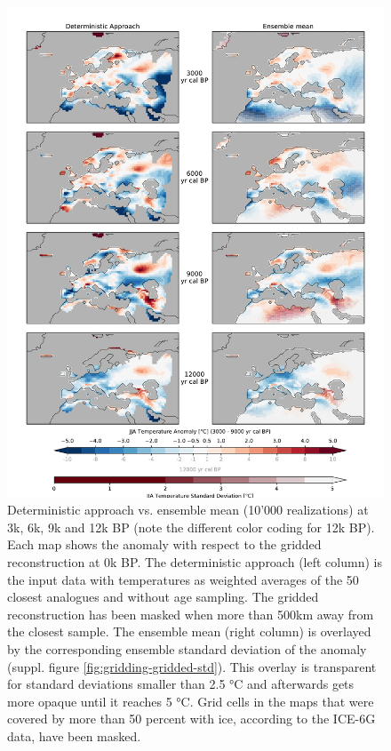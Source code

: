 \begin{refsection}
\begin{figure}
	\captionsetup{width=\linewidth}
	\includegraphics[width=\linewidth]{gridding-figures/deterministic-vs-ensemble.pdf}
	\caption[Deterministic approach vs. Ensemble mean]{Deterministic approach vs. ensemble mean (10'000 realizations) at 3k, 6k, 9k and 12k BP (note the different color coding for 12k BP). Each map shows the anomaly with respect to the gridded reconstruction at 0k BP. The deterministic approach (left column) is the input data with temperatures as weighted averages of the 50 closest analogues and without age sampling. The gridded reconstruction has been masked when more than 500km away from the closest sample. The ensemble mean (right column) is overlayed by the corresponding ensemble standard deviation of the anomaly (suppl. figure \ref{fig:gridding-gridded-std}). This overlay is transparent for standard deviations smaller than 2.5 °C and afterwards gets more opaque until it reaches 5 °C. Grid cells in the maps that were covered by more than 50 percent with ice, according to the ICE-6G data, have been masked.}
	\label{fig:gridding-gridded-mean}
\end{figure}


\end{refsection}
